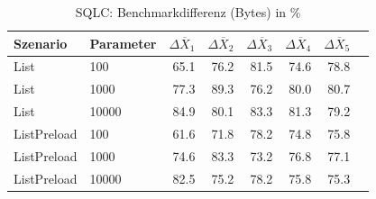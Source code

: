 
\begin{table}[ht]
\setlength{\extrarowheight}{-1pt}
\centering
\caption{SQLC: Benchmarkdifferenz (Bytes) in \%}
\begin{tabular}{llrrrrrr}
\toprule
Szenario & Parameter & ${\Delta \overline{X}_1}$ & ${\Delta \overline{X}_2}$ & ${\Delta \overline{X}_3}$ & ${\Delta \overline{X}_4}$ & ${\Delta \overline{X}_5}$ \\
\midrule
	List & 100 & \cellcolor{green!24}  65.1 & \cellcolor{green!20}  76.2 & \cellcolor{green!17}  81.5 & \cellcolor{green!20}  74.6 & \cellcolor{green!18}  78.8 \\
	List & 1000 & \cellcolor{green!19}  77.3 & \cellcolor{green!14}  89.3 & \cellcolor{green!20}  76.2 & \cellcolor{green!18}  80.0 & \cellcolor{green!18}  80.7 \\
	List & 10000 & \cellcolor{green!16}  84.9 & \cellcolor{green!18}  80.1 & \cellcolor{green!17}  83.3 & \cellcolor{green!17}  81.3 & \cellcolor{green!18}  79.2 \\
	ListPreload & 100 & \cellcolor{green!25}  61.6 & \cellcolor{green!21}  71.8 & \cellcolor{green!19}  78.2 & \cellcolor{green!20}  74.8 & \cellcolor{green!20}  75.8 \\
	ListPreload & 1000 & \cellcolor{green!20}  74.6 & \cellcolor{green!17}  83.3 & \cellcolor{green!21}  73.2 & \cellcolor{green!19}  76.8 & \cellcolor{green!19}  77.1 \\
	ListPreload & 10000 & \cellcolor{green!17}  82.5 & \cellcolor{green!20}  75.2 & \cellcolor{green!19}  78.2 & \cellcolor{green!20}  75.8 & \cellcolor{green!20}  75.3 \\
\bottomrule
\end{tabular}
\label{tab:benchmarkdifferenz_sqlc_bytes}
\end{table}
	